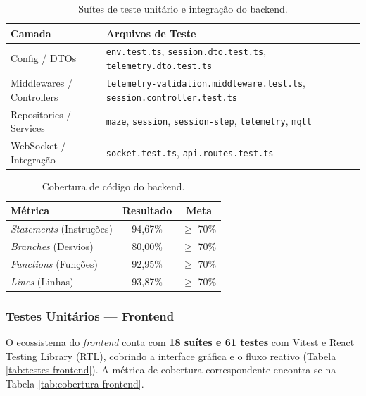 \begin{table}[H]
\centering
\small
\renewcommand{\arraystretch}{1.2}
\caption{Suítes de teste unitário e integração do backend.}
\label{tab:testes-backend}
\begin{tabularx}{\linewidth}{|l|X|}
\hline
\textbf{Camada} & \textbf{Arquivos de Teste} \\ \hline
Config / DTOs & \texttt{env.test.ts}, \texttt{session.dto.test.ts}, \texttt{telemetry.dto.test.ts} \\ \hline
Middlewares / Controllers & \texttt{telemetry-validation.middleware.test.ts}, \texttt{session.controller.test.ts} \\ \hline
Repositories / Services & \texttt{maze}, \texttt{session}, \texttt{session-step}, \texttt{telemetry}, \texttt{mqtt} \\ \hline
WebSocket / Integração & \texttt{socket.test.ts}, \texttt{api.routes.test.ts} \\ \hline
\end{tabularx}
\end{table}

\begin{table}[H]
\centering
\small
\renewcommand{\arraystretch}{1.2}
\caption{Cobertura de código do backend.}
\label{tab:cobertura-backend}
\begin{tabular}{|l|c|c|}
\hline
\textbf{Métrica} & \textbf{Resultado} & \textbf{Meta} \\ \hline
\textit{Statements} (Instruções) & 94,67\% & $\geq$ 70\% \\ \hline
\textit{Branches} (Desvios) & 80,00\% & $\geq$ 70\% \\ \hline
\textit{Functions} (Funções) & 92,95\% & $\geq$ 70\% \\ \hline
\textit{Lines} (Linhas) & 93,87\% & $\geq$ 70\% \\ \hline
\end{tabular}
\end{table}

\subsubsection{Testes Unitários — Frontend}
O ecossistema do \textit{frontend} conta com \textbf{18 suítes e 61 testes} com Vitest e React Testing Library (RTL), cobrindo a interface gráfica e o fluxo reativo (Tabela \ref{tab:testes-frontend}). A métrica de cobertura correspondente encontra-se na Tabela \ref{tab:cobertura-frontend}.

